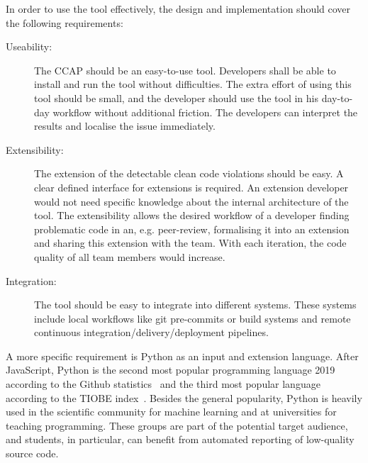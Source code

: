 In order to use the tool effectively, the design and implementation should cover the following requirements:
\begin{description}
    \item[Useability:]  The CCAP should be an easy-to-use tool. Developers shall be able to install and run the tool without difficulties. The extra effort of using this tool should be small, and the developer should use the tool in his day-to-day workflow without additional friction. The developers can interpret the results and localise the issue immediately.
    \item[Extensibility:] The extension of the detectable clean code violations should be easy. A clear defined interface for extensions is required. An extension developer would not need specific knowledge about the internal architecture of the tool. The extensibility allows the desired workflow of a developer finding problematic code in an, e.g. peer-review, formalising it into an extension and sharing this extension with the team. With each iteration, the code quality of all team members would increase.
    \item[Integration:] The tool should be easy to integrate into different systems. These systems include local workflows like git pre-commits or build systems and remote continuous integration/delivery/deployment pipelines.
\end{description}
A more specific requirement is Python as an input and extension language. After JavaScript, Python is the second most popular programming language 2019 according to the Github statistics~\cite{github_inc_state_2019} and the third most popular language according to the TIOBE index~\cite{tiobe_-_the_software_quality_company_tiobe_2020}. Besides the general popularity, Python is heavily used in the scientific community for machine learning and at universities for teaching programming. These groups are part of the potential target audience, and students, in particular, can benefit from automated reporting of low-quality source code.

